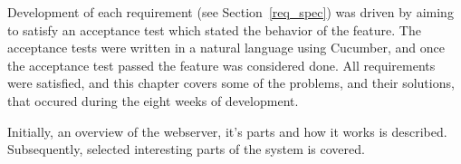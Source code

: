 
Development of each requirement (see Section~\ref{req_spec}) was driven by
aiming to satisfy an acceptance test which stated the behavior of the feature.
The acceptance tests were written in a natural language using Cucumber, and
once the acceptance test passed the feature was considered done. All
requirements were satisfied, and this chapter covers some of the problems, and
their solutions, that occured during the eight weeks of development.

Initially, an overview of the webserver, it's parts and how it works is
described. Subsequently, selected interesting parts of the system is covered.
